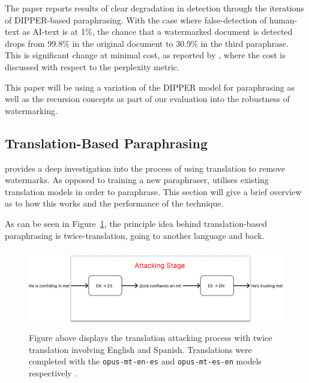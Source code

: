 \documentclass{l4proj}
\theoremstyle{definition}
\begin{document}
        The paper reports results of clear degradation in detection through the iterations of DIPPER-based paraphrasing. With the case where false-detection of human-text as AI-text is at 1\%, the chance that a watermarked document is detected drops from 99.8\% in the original document to 30.9\% in the third paraphrase. This is significant change at minimal cost, as reported by \citet{sadasivan2023aigenerated}, where the cost is discussed with respect to the perplexity metric.

        This paper will be using a variation of the DIPPER model for paraphrasing as well as the recursion concepts as part of our evaluation into the robustness of watermarking. 

    \subsection{Translation-Based Paraphrasing}
        \citet{he2024watermarks} provides a deep investigation into the process of using translation to remove watermarks. As opposed to training a new paraphraser, \citet{he2024watermarks} utilises existing translation models in order to paraphrase. This section will give a brief overview as to how this works and the performance of the technique. 

        As can be seen in Figure~\ref{fig:translation-removal-process}, the principle idea behind translation-based paraphrasing is twice-translation, going to another language and back. 

        \begin{figure}[h]
            \centering
            \includegraphics[height=3.5cm, width=1\linewidth, keepaspectratio]{images/background/translation-removal-process.pdf}
            \caption{Figure above displays the translation attacking process with twice translation involving English and Spanish. Translations were completed with the \texttt{opus-mt-en-es} and \texttt{opus-mt-es-en} models respectively \citep{TiedemannThottingal:EAMT2020}.}
            \label{fig:translation-removal-process}
        \end{figure}
        
\end{document}
